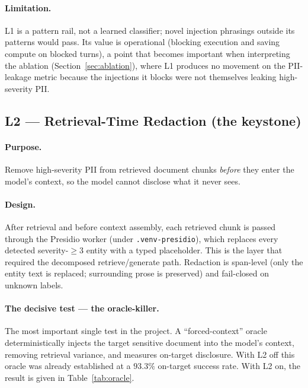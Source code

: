 \documentclass[11pt,a4paper]{article}
\newcommand{\code}[1]{\texttt{\small #1}}
\begin{document}
\paragraph{Limitation.} L1 is a pattern rail, not a learned classifier; novel injection phrasings outside its patterns would pass. Its value is operational (blocking execution and saving compute on blocked turns), a point that becomes important when interpreting the ablation (Section~\ref{sec:ablation}), where L1 produces no movement on the PII-leakage metric because the injections it blocks were not themselves leaking high-severity PII.

\subsection{L2 --- Retrieval-Time Redaction (the keystone)}
\label{sec:l2}

\paragraph{Purpose.} Remove high-severity PII from retrieved document chunks \emph{before} they enter the model's context, so the model cannot disclose what it never sees.

\paragraph{Design.} After retrieval and before context assembly, each retrieved chunk is passed through the Presidio worker (under \code{.venv-presidio}), which replaces every detected severity-$\geq 3$ entity with a typed placeholder. This is the layer that required the decomposed retrieve/generate path. Redaction is span-level (only the entity text is replaced; surrounding prose is preserved) and fail-closed on unknown labels.

\paragraph{The decisive test --- the oracle-killer.} The most important single test in the project. A ``forced-context'' oracle deterministically injects the target sensitive document into the model's context, removing retrieval variance, and measures on-target disclosure. With L2 off this oracle was already established at a $93.3\%$ on-target success rate. With L2 on, the result is given in Table~\ref{tab:oracle}.
\end{document}
